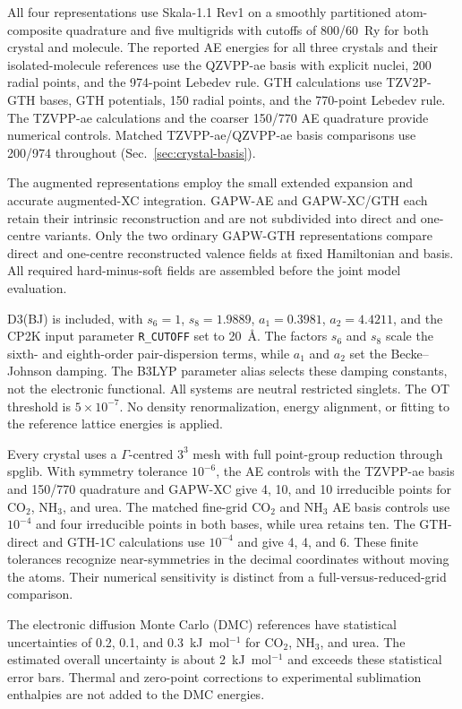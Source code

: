 \documentclass[10pt,a4paper]{article}
\begin{document}
All four representations use Skala-1.1 Rev1 on a smoothly partitioned atom-composite quadrature and five multigrids with cutoffs of 800/60~Ry for both crystal and molecule. The reported AE energies for all three crystals and their isolated-molecule references use the QZVPP-ae basis with explicit nuclei, 200 radial points, and the 974-point Lebedev rule. GTH calculations use TZV2P-GTH bases, GTH potentials, 150 radial points, and the 770-point Lebedev rule. The TZVPP-ae calculations and the coarser 150/770 AE quadrature provide numerical controls. Matched TZVPP-ae/QZVPP-ae basis comparisons use 200/974 throughout (Sec.~\ref{sec:crystal-basis}).

The augmented representations employ the small extended expansion and accurate augmented-XC integration.\cite{CP2K2020} GAPW-AE and GAPW-XC/GTH each retain their intrinsic reconstruction and are not subdivided into direct and one-centre variants. Only the two ordinary GAPW-GTH representations compare direct and one-centre reconstructed valence fields at fixed Hamiltonian and basis. All required hard-minus-soft fields are assembled before the joint model evaluation.

D3(BJ) is included, with $s_6=1$, $s_8=1.9889$, $a_1=0.3981$, $a_2=4.4211$, and the CP2K input parameter \texttt{R\_CUTOFF} set to 20~\AA{}.\cite{Grimme2011D3BJ} The factors $s_6$ and $s_8$ scale the sixth- and eighth-order pair-dispersion terms, while $a_1$ and $a_2$ set the Becke--Johnson damping. The B3LYP parameter alias selects these damping constants, not the electronic functional. All systems are neutral restricted singlets. The OT threshold is $5\times10^{-7}$. No density renormalization, energy alignment, or fitting to the reference lattice energies is applied.

Every crystal uses a $\Gamma$-centred $3^3$ mesh with full point-group reduction through spglib.\cite{Togo2024Spglib} With symmetry tolerance $10^{-6}$, the AE controls with the TZVPP-ae basis and 150/770 quadrature and GAPW-XC give 4, 10, and 10 irreducible points for CO$_2$, NH$_3$, and urea. The matched fine-grid CO$_2$ and NH$_3$ AE basis controls use $10^{-4}$ and four irreducible points in both bases, while urea retains ten. The GTH-direct and GTH-1C calculations use $10^{-4}$ and give 4, 4, and 6. These finite tolerances recognize near-symmetries in the decimal coordinates without moving the atoms. Their numerical sensitivity is distinct from a full-versus-reduced-grid comparison.

The electronic diffusion Monte Carlo (DMC) references have statistical uncertainties of 0.2, 0.1, and 0.3~kJ~mol$^{-1}$ for CO$_2$, NH$_3$, and urea. The estimated overall uncertainty is about 2~kJ~mol$^{-1}$ and exceeds these statistical error bars.\cite{DellaPia2024X23} Thermal and zero-point corrections to experimental sublimation enthalpies are not added to the DMC energies.
\end{document}
